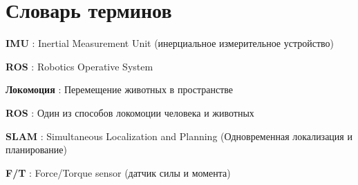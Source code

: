\chapter*{Словарь терминов}             %

\textbf{IMU} : Inertial Measurement Unit (инерциальное измерительное устройство)

\textbf{ROS} : Robotics Operative System

\textbf{Локомоция} : Перемещение животных в пространстве

\textbf{ROS} : Один из способов локомоции человека и животных

\textbf{SLAM} : Simultaneous Localization and Planning (Одновременная локализация и планирование)

\textbf{F/T} : Force/Torque sensor (датчик силы и момента)

